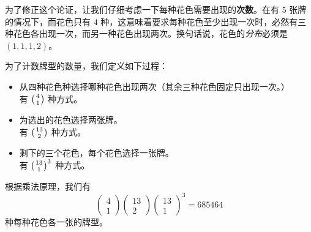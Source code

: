 \begin{example}
    为了修正这个论证，让我们仔细考虑一下每种花色需要出现的\textbf{次数}。在有 $5$ 张牌的情况下，而花色只有 $4$ 种，这意味着要求每种花色至少出现一次时，必然有三种花色各出现一次，而另一种花色出现两次。换句话说，花色的\emph{分布}必须是 $(1, 1, 1, 2)$。

    为了计数牌型的数量，我们定义如下过程：
    \begin{itemize}
        \item 从四种花色种选择哪种花色出现两次（其余三种花色固定只出现一次。）\\
              有 $\big({4 \atop 1}\big)$ 种方式。
        \item 为选出的花色选择两张牌。\\
              有 $\big({13 \atop 2}\big)$ 种方式。
        \item 剩下的三个花色，每个花色选择一张牌。\\
              有 $\big({13 \atop 1}\big)^3$ 种方式。
    \end{itemize}
    根据乘法原理，我们有
    \[\begin{pmatrix}
            4 \\
            1
        \end{pmatrix}\begin{pmatrix}
            13 \\
            2
        \end{pmatrix}\begin{pmatrix}
            13 \\
            1
        \end{pmatrix}^3 = 685464\]
    种每种花色各一张的牌型。
\end{example}

